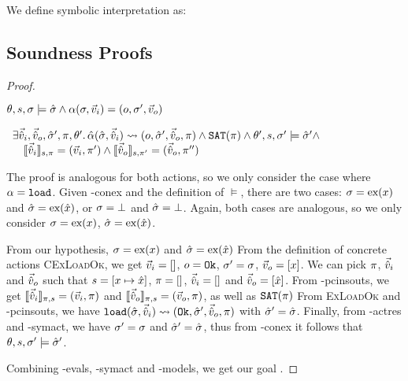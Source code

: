 We define symbolic interpretation as:

\subsection{Soundness Proofs}

\begin{proof}


\pfassume \begin{hypvlist}
 $\theta,s,\st\models\sst \land \ppexecc{\alpha}{\st,\ins}{o,\st',\outs}$
\end{hypvlist}
\pfprove \begin{goalvlist}
 $
\begin{array}{l}
\exists \sins,\souts,\sst',\pc,\theta'\ldotp \ppexec{\hat\alpha}{\sst,\sins}{o,\sst',\souts,\pc} \land \SAT(\pc) \land \theta',s,\st'\models \sst' \land\\
\quad \expeval[s,\pc]{\sins}=(\ins,\pc')\land\expeval[s,\pc']{\souts}=(\souts,\pc'')
\end{array}
$
\end{goalvlist}

The proof is analogous for both actions, so we only consider the case where $\alpha=\load$. Given \hyp{conex} and the definition of $\models$, there are two cases: $\st=\ex{x}$ and $\sst=\ex{\sym x}$, or $\st=\bot$ and $\sst=\bot$. Again, both cases are analogous, so we only consider $\st=\ex{x}$, $\sst=\ex{\sym x}$.

\begin{hypvlist}
 From our hypothesis, $\st=\ex{x}$ and $\sst=\ex{\sym x}$
 From the definition of concrete actions \textsc{CExLoadOk}, we get $\ins=[]$, $o=\Ok$, $\st'=\st$, $\outs=[x]$.
 We can pick $\pc$, $\sins$ and $\souts$ such that $s=[x\mapsto \sym x]$, $\pc = []$, $\sins=[]$ and $\souts=[\sym x]$.
 From \hyp{pcinsouts}, we get $\expeval[\pc,s]{\sins}=(\ins,\pc)$ and $\expeval[\pc,s]{\souts}=(\outs,\pc)$, as well as $\SAT(\pc)$
 From \textsc{ExLoadOk} and \hyp{pcinsouts}, we have $\ppexec{\load}{\sst,\sins}{\Ok, \sst', \souts, \pc}$ with $\sst'=\sst$.
 Finally, from \hyp{actres} and \hyp{symact}, we have $\st'=\st$ and $\sst'=\sst$, thus from \hyp{conex} it follows that $\theta,s,\st'\models\sst'$.
\end{hypvlist}
Combining \hyp{evals}, \hyp{symact} and \hyp{models}, we get our goal .


\end{proof}
